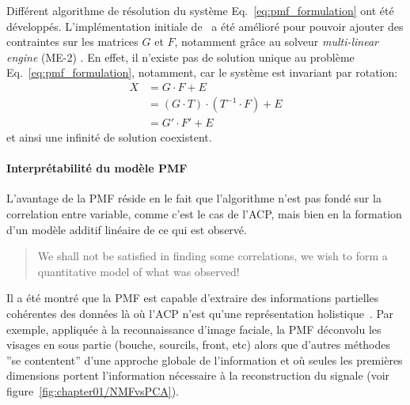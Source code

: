 Différent algorithme de résolution du système Eq.~\ref{eq:pmf_formulation} ont été développés.
L'implémentation initiale de~\textcite{paateroLeast1997} a été amélioré pour pouvoir
ajouter des contraintes sur les matrices $G$ et $F$, notamment grâce au solveur
\textit{multi-linear engine} (ME-2) \autocite{paateroMultilinear1999}. En effet, il
n'existe pas de solution unique au problème Eq.~\ref{eq:pmf_formulation}, notamment, car le
système est invariant par rotation:
\begin{align}
    \label{eq:rotationalambiguity}
    X   &= G \cdot F + E \\
        &= (G \cdot T) \cdot (T^{-1} \cdot F) + E\\
        &= G' \cdot F' + E
\end{align}
et ainsi une infinité de solution coexistent. 

\paragraph{Interprétabilité du modèle PMF}%
\label{par:interpretabilite_du_model_PMF}

L'avantage de la PMF réside en le fait que l'algorithme n'est pas fondé sur la
correlation entre variable, comme c'est le cas de l'ACP, mais bien en la formation d'un
modèle additif linéaire de ce qui est observé.
\begin{quote}
    We shall not be satisfied in finding some correlations, we wish to form a quantitative
    model of what was observed! \autocite{paateroPositive1994}
\end{quote}

Il a été montré que la PMF est capable d'extraire des informations partielles cohérentes des
données là où l'ACP n'est qu'une représentation holistique~\autocite{leeLearning1999}. Par
exemple, appliquée à la reconnaissance d'image faciale, la PMF déconvolu les visages en
sous partie (bouche, sourcils, front, etc) alors que d'autres méthodes ''se contentent''
d'une approche globale de l'information et où seules les premières dimensions portent
l'information nécessaire à la reconstruction du signale (voir
figure~\ref{fig:chapter01/NMFvsPCA}).


